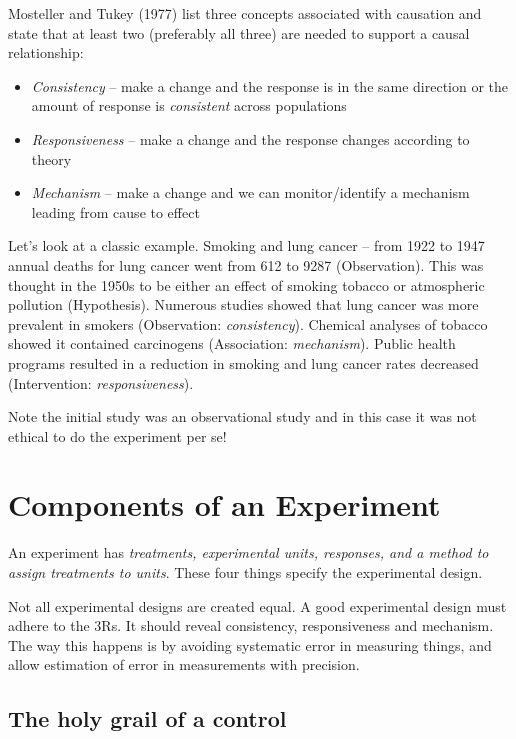 \documentclass[
]{book}
\providecommand{\tightlist}{%
  \setlength{\itemsep}{0pt}\setlength{\parskip}{0pt}}
\begin{document}
Mosteller and Tukey (1977) list three concepts associated with causation and state that at least two (preferably all three) are needed to support a causal relationship:

\begin{itemize}
\tightlist
\item
  \emph{Consistency} -- make a change and the response is in the same direction or the amount of response is \emph{consistent} across populations
\item
  \emph{Responsiveness} -- make a change and the response changes according to theory
\item
  \emph{Mechanism} -- make a change and we can monitor/identify a mechanism leading from cause to effect
\end{itemize}

Let's look at a classic example. Smoking and lung cancer -- from 1922 to 1947 annual deaths for lung cancer went from 612 to 9287 (Observation). This was thought in the 1950s to be either an effect of smoking tobacco or atmospheric pollution (Hypothesis). Numerous studies showed that lung cancer was more prevalent in smokers (Observation: \emph{consistency}). Chemical analyses of tobacco showed it contained carcinogens (Association: \emph{mechanism}). Public health programs resulted in a reduction in smoking and lung cancer rates decreased (Intervention: \emph{responsiveness}).

Note the initial study was an observational study and in this case it was not ethical to do the experiment per se!

\hypertarget{components-of-an-experiment}{%
\section{Components of an Experiment}\label{components-of-an-experiment}}

An experiment has \emph{treatments, experimental units, responses, and a method to assign treatments to units}. These four things specify the experimental design.

Not all experimental designs are created equal. A good experimental design must adhere to the 3Rs. It should reveal consistency, responsiveness and mechanism. The way this happens is by avoiding systematic error in measuring things, and allow estimation of error in measurements with precision.

\hypertarget{the-holy-grail-of-a-control}{%
\subsection{The holy grail of a control}\label{the-holy-grail-of-a-control}}
\end{document}
